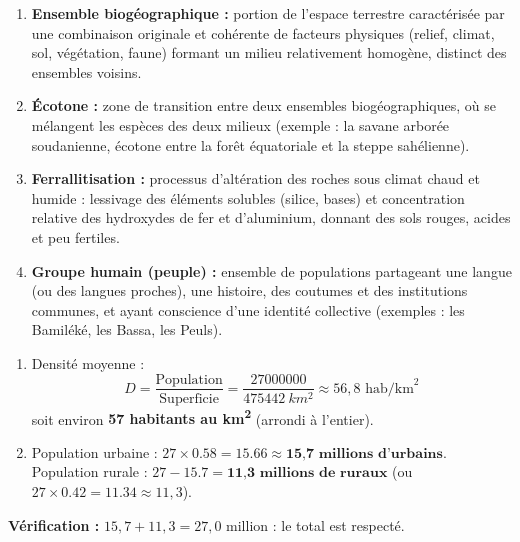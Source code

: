 \documentclass[11pt]{article}
\begin{document}
\begin{corrige}
\begin{enumerate}
\item \textbf{Ensemble biogéographique :} portion de l'espace terrestre caractérisée par une combinaison originale et cohérente de facteurs physiques (relief, climat, sol, végétation, faune) formant un milieu relativement homogène, distinct des ensembles voisins.
\item \textbf{Écotone :} zone de transition entre deux ensembles biogéographiques, où se mélangent les espèces des deux milieux (exemple : la savane arborée soudanienne, écotone entre la forêt équatoriale et la steppe sahélienne).
\item \textbf{Ferrallitisation :} processus d'altération des roches sous climat chaud et humide : lessivage des éléments solubles (silice, bases) et concentration relative des hydroxydes de fer et d'aluminium, donnant des sols rouges, acides et peu fertiles.
\item \textbf{Groupe humain (peuple) :} ensemble de populations partageant une langue (ou des langues proches), une histoire, des coutumes et des institutions communes, et ayant conscience d'une identité collective (exemples : les Bamiléké, les Bassa, les Peuls).
\end{enumerate}
\end{corrige}

\begin{corrige}
\begin{enumerate}
\item Densité moyenne :
\[ D = \frac{\text{Population}}{\text{Superficie}} = \frac{\num{27000000}}{\SI{475442}{km^2}} \approx 56,8 \text{ hab/km}^2 \]
soit environ \textbf{57 habitants au km\textsuperscript{2}} (arrondi à l'entier).
\item Population urbaine : $\num{27} \times \num{0,58} = \num{15,66} \approx \textbf{15,7 millions d'urbains}$.\\
Population rurale : $\num{27} - \num{15,7} = \textbf{11,3 millions de ruraux}$ (ou $\num{27} \times \num{0,42} = \num{11,34} \approx 11,3$).
\end{enumerate}
\textbf{Vérification :} $15,7 + 11,3 = 27,0$ million : le total est respecté.
\end{corrige}
\end{document}
